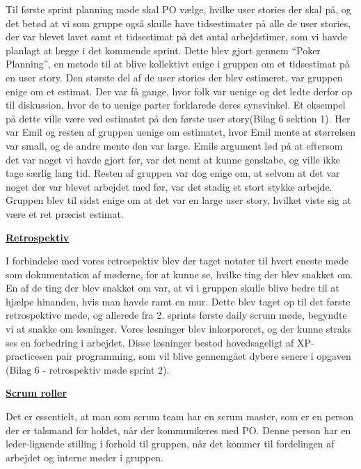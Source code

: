 \documentclass[11pt]{report}
\begin{document}
Til første sprint planning møde skal PO vælge, hvilke user stories der skal på, og det betød at vi som gruppe også skulle have tidsestimater på alle de user stories, der var blevet lavet samt et tidsestimat på det antal arbejdstimer, som vi havde planlagt at lægge i det kommende sprint. Dette blev gjort gennem “Poker Planning”, en metode til at blive kollektivt enige i gruppen om et tidsestimat på en user story. Den største del af de user stories der blev estimeret, var gruppen enige om et estimat. Der var få gange, hvor folk var uenige og det ledte derfor op til diskussion, hvor de to uenige parter forklarede deres synsvinkel. Et eksempel på dette ville være ved estimatet på den første user story(Bilag 6 sektion 1). Her var Emil og resten af gruppen uenige om estimatet, hvor Emil mente at størrelsen var small, og de andre mente den var large. Emils argument lød på at eftersom det var noget vi havde gjort før, var det nemt at kunne genskabe, og ville ikke tage særlig lang tid. Resten af gruppen var dog enige om, at selvom at det var noget der var blevet arbejdet med før, var det stadig et stort stykke arbejde. Gruppen blev til sidst enige om at det var en large user story, hvilket viste sig at være et ret præcist estimat.

\newpage
\noindent\underline{\textbf{Retrospektiv}}
\par I forbindelse med vores retrospektiv blev der taget notater til hvert eneste møde som dokumentation af møderne, for at kunne se, hvilke ting der blev snakket om. En af de ting der blev snakket om var, at vi i gruppen skulle blive bedre til at hjælpe hinanden, hvis man havde ramt en mur. Dette blev taget op til det første retrospektive møde, og allerede fra 2. sprints første daily scrum møde, begyndte vi at snakke om løsninger. Vores løsninger blev inkorporeret, og der kunne straks ses en forbedring i arbejdet. Disse løsninger bestod hovedsageligt af XP-practicesen pair programming, som vil blive gennemgået dybere senere i opgaven (Bilag 6 - retrospektiv møde sprint 2).

\noindent\underline{\textbf{Scrum roller}}
\par Det er essentielt, at man som scrum team har en scrum master, som er en person der er talsmand for holdet, når der kommunikeres med PO. Denne person har en leder-lignende stilling i forhold til gruppen, når det kommer til fordelingen af arbejdet og interne møder i gruppen.
\end{document}

